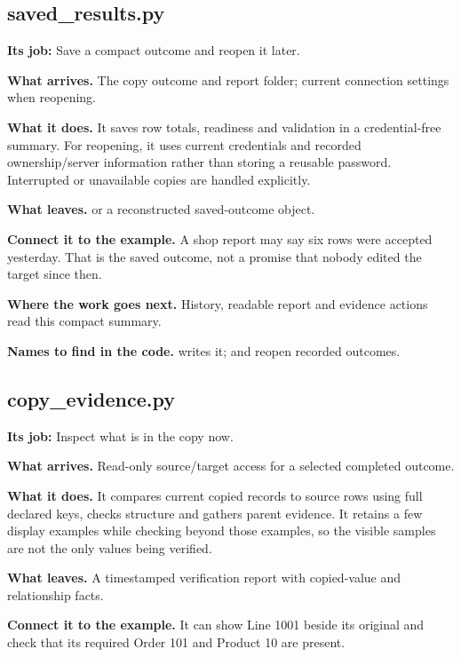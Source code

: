 
\subsection{saved\_results.py}

\textbf{Its job:} Save a compact outcome and reopen it later.

\textbf{What arrives.} The copy outcome and report folder; current connection settings when reopening.

\textbf{What it does.} It saves row totals, readiness and validation in a credential-free summary. For reopening, it uses current credentials and recorded ownership/server information rather than storing a reusable password. Interrupted or unavailable copies are handled explicitly.

\textbf{What leaves.}  or a reconstructed saved-outcome object.

\textbf{Connect it to the example.} A shop report may say six rows were accepted yesterday. That is the saved outcome, not a promise that nobody edited the target since then.

\textbf{Where the work goes next.} History, readable report and evidence actions read this compact summary.

\textbf{Names to find in the code.}  writes it;  and  reopen recorded outcomes.


\subsection{copy\_evidence.py}

\textbf{Its job:} Inspect what is in the copy now.

\textbf{What arrives.} Read-only source/target access for a selected completed outcome.

\textbf{What it does.} It compares current copied records to source rows using full declared keys, checks structure and gathers parent evidence. It retains a few display examples while checking beyond those examples, so the visible samples are not the only values being verified.

\textbf{What leaves.} A timestamped verification report with copied-value and relationship facts.

\textbf{Connect it to the example.} It can show Line 1001 beside its original and check that its required Order 101 and Product 10 are present.

